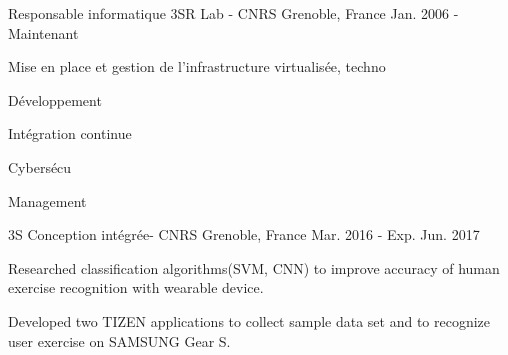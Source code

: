 

\begin{cventries}

  \cventry
    {Responsable informatique} %
    {3SR Lab - CNRS} %
    {Grenoble, France} %
    {Jan. 2006 - Maintenant} %
    {
      \begin{cvitems} %
        \item {Mise en place et gestion de l'infrastructure virtualisée, techno}
        \item {Développement}
        \item {Intégration continue}
        \item {Cybersécu}
        \item {Management}
      \end{cvitems}
    }

  \cventry
    {} %
    {3S Conception intégrée- CNRS} %
    {Grenoble, France} %
    {Mar. 2016 - Exp. Jun. 2017} %
    {
      \begin{cvitems} %
        \item {Researched classification algorithms(SVM, CNN) to improve accuracy of human exercise recognition with wearable device.}
        \item {Developed two TIZEN applications to collect sample data set and to recognize user exercise on SAMSUNG Gear S.}
      \end{cvitems}
    }

\end{cventries}
